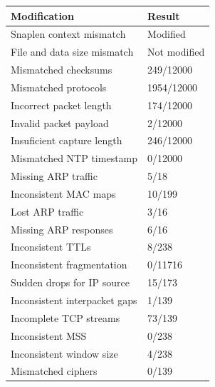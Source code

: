 \documentclass[
  printed,     %
  color,       %
  oneside,     %
  nosansbold,  %
  nocolorbold, %
  nolof,         %
  nolot,         %
]{fithesis4}
\begin{document}
\begin{table}[]
\begin{tabular}{ll}
\hline
\multicolumn{1}{l|}{\textbf{Modification}}                 & \textbf{Result} \\ \hline
\multicolumn{1}{l|}{Snaplen context mismatch}              & Modified        \\
\multicolumn{1}{l|}{File and data size mismatch}           & Not modified    \\
\multicolumn{1}{l|}{Mismatched checksums}                  & 249/12000       \\
\multicolumn{1}{l|}{Mismatched protocols}                  & 1954/12000      \\
\multicolumn{1}{l|}{Incorrect packet length}               & 174/12000       \\
\multicolumn{1}{l|}{Invalid packet payload}                & 2/12000         \\
\multicolumn{1}{l|}{Insuficient capture length}            & 246/12000       \\
\multicolumn{1}{l|}{Mismatched NTP timestamp}              & 0/12000         \\
\multicolumn{1}{l|}{Missing ARP traffic}                   & 5/18            \\
\multicolumn{1}{l|}{Inconsistent MAC maps}                 & 10/199          \\
\multicolumn{1}{l|}{Lost ARP traffic}                      & 3/16            \\
\multicolumn{1}{l|}{Missing ARP responses}                 & 6/16            \\
\multicolumn{1}{l|}{Inconsistent TTLs}                     & 8/238           \\
\multicolumn{1}{l|}{Inconsistent fragmentation}            & 0/11716         \\
\multicolumn{1}{l|}{Sudden drops for IP source}            & 15/173          \\
\multicolumn{1}{l|}{Inconsistent interpacket gaps}         & 1/139          \\
\multicolumn{1}{l|}{Incomplete TCP streams}                & 73/139          \\
\multicolumn{1}{l|}{Inconsistent MSS}                      & 0/238           \\
\multicolumn{1}{l|}{Inconsistent window size}              & 4/238           \\
\multicolumn{1}{l|}{Mismatched ciphers}                    & 0/139           \\

\end{tabular}
\end{table}
\end{document}
